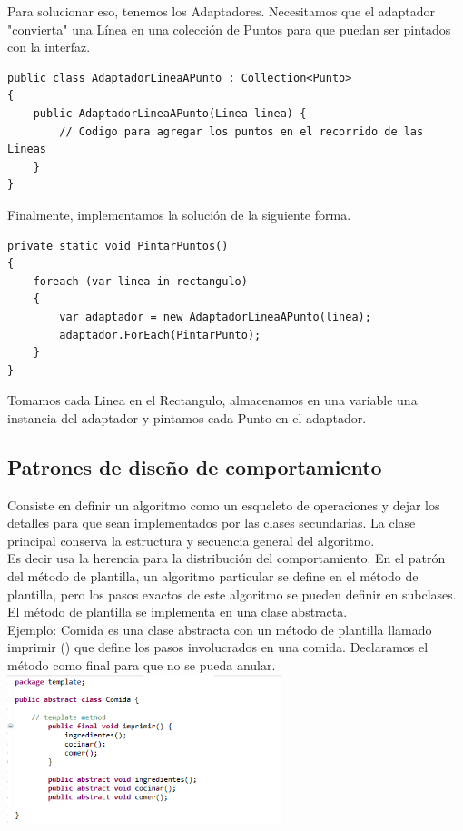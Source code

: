\documentclass[twoside,twocolumn]{article}
\begin{document}
Para solucionar eso, tenemos los Adaptadores. Necesitamos que el adaptador "convierta" una Línea en una colección de Puntos para que puedan ser pintados con la interfaz.
\lstset{style=sharpc}
\begin{lstlisting}
public class AdaptadorLineaAPunto : Collection<Punto>
{
    public AdaptadorLineaAPunto(Linea linea) {
        // Codigo para agregar los puntos en el recorrido de las Lineas
    }
}
\end{lstlisting}

Finalmente, implementamos la solución de la siguiente forma.
\lstset{style=sharpc}
\begin{lstlisting}
private static void PintarPuntos()
{
    foreach (var linea in rectangulo)
    {
        var adaptador = new AdaptadorLineaAPunto(linea);
        adaptador.ForEach(PintarPunto);
    }  
}
\end{lstlisting}

Tomamos cada Linea en el Rectangulo, almacenamos en una variable una instancia del adaptador y pintamos cada Punto en el adaptador.


\subsection{Patrones de diseño de comportamiento}
Consiste en definir un algoritmo como un esqueleto de operaciones y dejar los detalles para que sean implementados por las clases secundarias. La clase principal conserva la estructura y secuencia general del algoritmo.\\

Es decir usa la herencia para la distribución del comportamiento. En el patrón del método de plantilla,  un algoritmo particular se define en el método de plantilla, pero los pasos exactos de este algoritmo se pueden definir en subclases. El método de plantilla se implementa en una clase abstracta.\\

Ejemplo: Comida es una clase abstracta con un método de plantilla llamado imprimir () que define los pasos involucrados en una comida. Declaramos el método como final para que no se pueda anular.\\ 

\includegraphics[width=8cm]{Imagenes/imagen}
\end{document}
